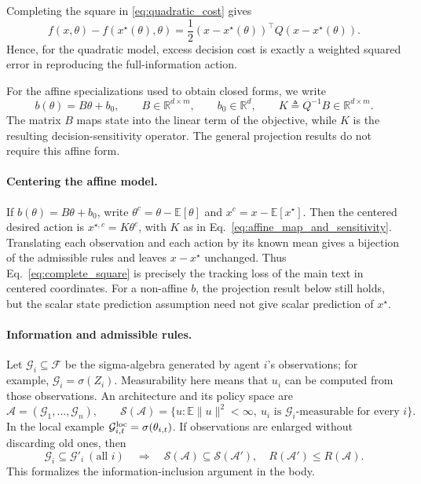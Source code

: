 Completing the square in \eqref{eq:quadratic_cost} gives
\begin{equation}
    f(x,\theta)-f(x^\star(\theta),\theta)
    =
    \frac{1}{2}
    \left(x-x^\star(\theta)\right)^\top
    Q
    \left(x-x^\star(\theta)\right).
    \label{eq:complete_square}
\end{equation}
Hence, for the quadratic model, excess decision cost is exactly a weighted
squared error in reproducing the full-information action.

For the affine specializations used to obtain closed forms, we write
\begin{equation}
    b(\theta)=B\theta+b_0,
    \qquad
    B\in\mathbb{R}^{d\times m},
    \qquad
    b_0\in\mathbb{R}^{d},
    \qquad
    K\triangleq Q^{-1}B\in\mathbb{R}^{d\times m}.
    \label{eq:affine_map_and_sensitivity}
\end{equation}
The matrix $B$ maps state into the linear term of the objective, while $K$ is
the resulting decision-sensitivity operator. The general projection results do
not require this affine form.



\paragraph{Centering the affine model.}
If $b(\theta)=B\theta+b_0$, write
$\theta^c=\theta-\mathbb E[\theta]$ and
$x^c=x-\mathbb E[x^\star]$. Then the centered desired action is
$x^{\star,c}=K\theta^c$, with $K$ as in
Eq.~\eqref{eq:affine_map_and_sensitivity}. Translating each observation and
each action by its known mean gives a bijection of the admissible rules
and leaves $x-x^\star$ unchanged. Thus Eq.~\eqref{eq:complete_square}
is precisely the tracking loss of the main text in centered coordinates.
For a non-affine $b$, the projection result below still holds, but the scalar
state prediction assumption need not give scalar prediction of $x^\star$.

\paragraph{Information and admissible rules.}
Let $\mathcal G_i\subseteq\mathcal F$ be the sigma-algebra generated by
agent $i$'s observations; for example, $\mathcal G_i=\sigma(Z_i)$.
Measurability here means that $u_i$ can be computed from those observations.
An architecture and its policy space are
\begin{equation}
\mathcal A=(\mathcal G_1,\ldots,\mathcal G_n),\qquad
\mathcal S(\mathcal A)=\{u:\mathbb E\|u\|^2<\infty,
\ u_i\text{ is }\mathcal G_i\text{-measurable for every }i\}.
\label{eq:policy_subspace}
\end{equation}
In the local example $\mathcal G^{\rm loc}_{i,t}=\sigma(\theta_{i,t})$.
If observations are enlarged without discarding old ones, then
\begin{equation}
\mathcal G_i\subseteq\mathcal G'_i\ (\text{all }i)
\quad\Longrightarrow\quad
\mathcal S(\mathcal A)\subseteq\mathcal S(\mathcal A'),\quad
R(\mathcal A')\le R(\mathcal A).
\label{eq:info_inclusion}
\end{equation}
This formalizes the information-inclusion argument in the body.


